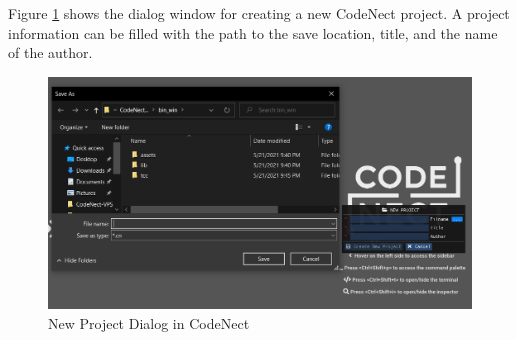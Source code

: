 \parx
Figure \ref{fig:cn_new_project} shows the dialog window for creating a new CodeNect
project. A project information can be filled with the path to the save
location, title, and the name of the author.

\begin{figure}[H]
	\centering
	\captionsetup{justification=centering}
	\captionsetup[figure]{list=yes}
	\includegraphics[width=\linewidth]{media/sc_new_project.png}
	\caption[New Project Dialog in CodeNect]{New Project Dialog in CodeNect}
	\label{fig:cn_new_project}
\end{figure}
